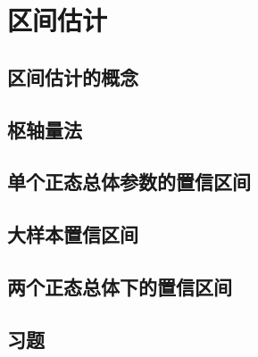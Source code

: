 \section{区间估计}
\subsection{区间估计的概念}
\subsection{枢轴量法}
\subsection{单个正态总体参数的置信区间}
\subsection{大样本置信区间}
\subsection{两个正态总体下的置信区间}
\subsection{习题}
